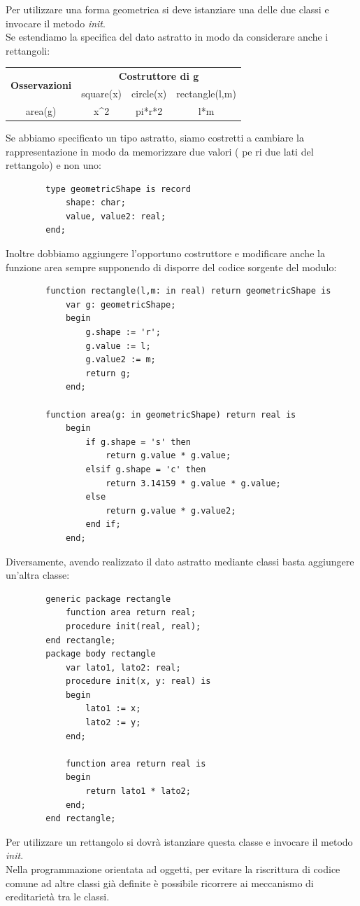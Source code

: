 \documentclass{article}
\begin{document}
	Per utilizzare una forma geometrica si deve istanziare una delle due classi e invocare il metodo \textit{init}.
	\vspace{\baselineskip} \\
	Se estendiamo la specifica del dato astratto in modo da considerare anche i rettangoli:
	\begin{center}
		\begin{tabular}{|c|ccc|}
			\hline
			\multirow{2}{*}{\textbf{Osservazioni}} & \multicolumn{3}{c|}{\textbf{Costruttore di g}}                                              \\ \cline{2-4} 
												   & \multicolumn{1}{c|}{square(x)}            & \multicolumn{1}{c|}{circle(x)} & rectangle(l,m) \\ \hline
			area(g)                                & \multicolumn{1}{c|}{x\textasciicircum{}2} & \multicolumn{1}{c|}{pi*r*2}    & l*m            \\ \hline
		\end{tabular}
	\end{center}
	Se abbiamo specificato un tipo astratto, siamo costretti a cambiare la rappresentazione in modo da memorizzare due valori ( pe ri due lati del rettangolo) e non uno:
	\begin{verbatim}
		type geometricShape is record
			shape: char;
			value, value2: real;
		end;
	\end{verbatim}
	Inoltre dobbiamo aggiungere l'opportuno costruttore e modificare anche la funzione area sempre supponendo di disporre del codice sorgente del modulo:
	\begin{verbatim}
		function rectangle(l,m: in real) return geometricShape is
			var g: geometricShape;
			begin
				g.shape := 'r';
				g.value := l;
				g.value2 := m;
				return g;
			end;

		function area(g: in geometricShape) return real is
			begin
				if g.shape = 's' then
					return g.value * g.value;
				elsif g.shape = 'c' then
					return 3.14159 * g.value * g.value;
				else
					return g.value * g.value2;
				end if;
			end;
	\end{verbatim}
	Diversamente, avendo realizzato il dato astratto mediante classi basta aggiungere un'altra classe:
	\begin{verbatim}
		generic package rectangle
			function area return real;
			procedure init(real, real);
		end rectangle;
		package body rectangle
			var lato1, lato2: real;
			procedure init(x, y: real) is
			begin
				lato1 := x;
				lato2 := y;
			end;

			function area return real is
			begin
				return lato1 * lato2;
			end;
		end rectangle;
	\end{verbatim}
	Per utilizzare un rettangolo si dovrà istanziare questa classe e invocare il metodo \textit{init}. \\
	Nella programmazione orientata ad oggetti, per evitare la riscrittura di codice comune ad altre classi già definite è possibile ricorrere ai meccanismo di ereditarietà tra le classi.
\end{document}
